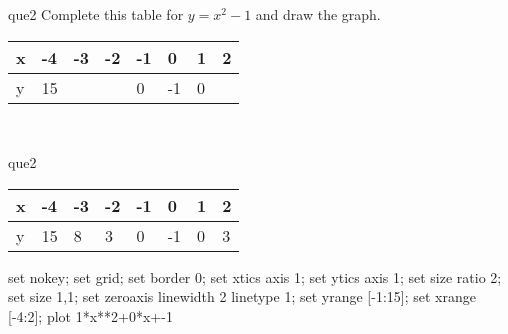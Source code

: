 \documentclass[13.5pt, varwidth=true]{beamer}
\begin{document}
\begin{frame}[shrink=19,fragile]
	\begin{beamercolorbox}[rounded=true, left, shadow=true,wd=14.8cm]{que2}
		 Complete this table for $y = x^{2} - 1$ and draw the graph. \\[0.3cm] \renewcommand{\arraystretch}{1.2}\begin{tabular}{|C|C|C|C|C|C|C|C|} \hline x & -4 & -3 & -2 & -1 & 0 & 1 & 2 \\ \hline y & 15 &  &  & 0 & -1 & 0 & \\ \hline \end{tabular}\\[0.3cm]
	\end{beamercolorbox}
\end{frame}
\begin{frame}[shrink=19,fragile]
	\begin{beamercolorbox}[rounded=true, left, shadow=true,wd=14.8cm]{que2}
		\renewcommand{\arraystretch}{1.2}\begin{tabular}{|C|C|C|C|C|C|C|C|} \hline x & -4 & -3 & -2 & -1 & 0 & 1 & 2 \\ \hline y & 15 & 8 & 3 & 0 & -1 & 0 & 3\\ \hline \end{tabular}\begin{gnuplot}[terminal=pdf] set nokey; set grid; set border 0; set xtics axis 1; set ytics axis 1; set size ratio 2; set size 1,1; set zeroaxis linewidth 2 linetype 1; set yrange [-1:15]; set xrange [-4:2]; plot 1*x**2+0*x+-1 \end{gnuplot}
	\end{beamercolorbox}
\end{frame}
\end{document}

